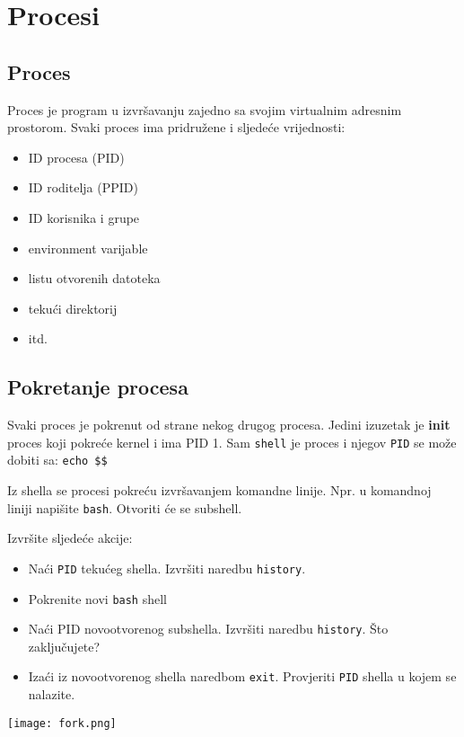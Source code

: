 \section{Procesi}
\subsection*{Proces}
Proces je program u izvršavanju zajedno sa svojim virtualnim adresnim prostorom. Svaki proces ima pridružene i sljedeće vrijednosti:
\begin{itemize}
 \item ID procesa (PID)
 \item ID roditelja (PPID)
 \item ID korisnika i grupe
 \item environment varijable
 \item listu otvorenih datoteka
 \item tekući direktorij
 \item itd.
\end{itemize}
\subsection*{Pokretanje procesa}
Svaki proces je pokrenut od strane nekog drugog procesa. Jedini izuzetak je \textbf{init} proces koji pokreće kernel i ima PID 1. Sam \texttt{shell} je proces i njegov \texttt{PID} se može dobiti sa: \texttt{echo \$\$}

Iz shella se procesi pokreću izvršavanjem komandne linije. Npr. u komandnoj liniji napišite \texttt{bash}. Otvoriti će se subshell. 

\begin{zadatak} Izvršite sljedeće akcije:
\begin{itemize} 
 \item Naći \texttt{PID} tekućeg shella. Izvršiti naredbu \texttt{history}.
 \item Pokrenite novi \texttt{bash} shell
 \item Naći PID novootvorenog subshella. Izvršiti naredbu \texttt{history}. Što zaključujete?
 \item Izaći iz novootvorenog shella naredbom \texttt{exit}. Provjeriti \texttt{PID} shella u kojem se nalazite. 
\end{itemize}
  
\end{zadatak}
\begin{center} 
\texttt{[image: fork.png]}%
\end{center}


